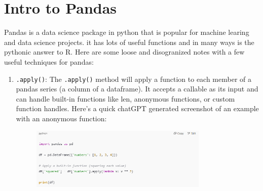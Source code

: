 \documentclass[12pt]{article}
\begin{document}
\section{Intro to Pandas}
Pandas is a data science package in python that is popular for machine learing and data science projects. it has lots of useful functions and in many ways is the pythonic answer to R. Here are some loose and disogranized notes with a few useful techniques for pandas:
\begin{enumerate}
\item \texttt{.apply()}: The  \texttt{.apply()} method will apply a function to each member of a pandas series (a column of a dataframe). It accepts a callable as its input and can handle built-in functions like len, anonymous functions, or custom function handles. Here's a quick chatGPT generated screenshot of an example with an anonymous function:
\begin{figure}[H]
    \centering
    \includegraphics[width=0.8\textwidth]{./apply.png} %
\end{figure}
\end{enumerate}
\end{document}
